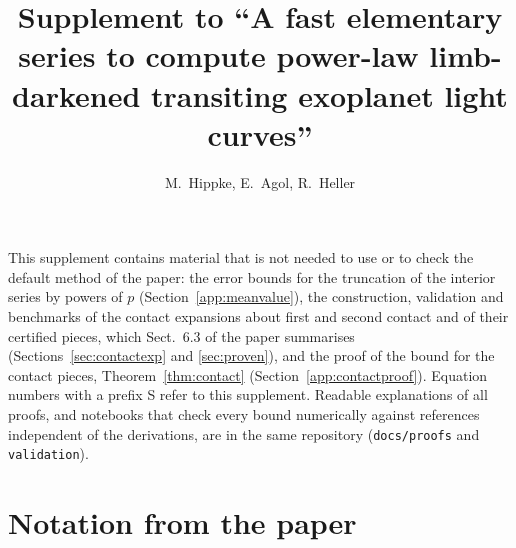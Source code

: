 \documentclass[11pt]{article}
\title{Supplement to ``A fast elementary series to compute power-law limb-darkened transiting exoplanet light curves''}
\author{M.~Hippke, E.~Agol, R.~Heller}
\date{}
\begin{document}
\maketitle

This supplement contains material that is not needed to use or to check the default method of the paper:
the error bounds for the truncation of the interior series by powers of $p$ (Section~\ref{app:meanvalue}),
the construction, validation and benchmarks of the contact expansions about first and second contact and of their
certified pieces, which Sect.~6.3 of the paper summarises (Sections~\ref{sec:contactexp} and \ref{sec:proven}),
and the proof of the bound for the contact pieces, Theorem~\ref{thm:contact} (Section~\ref{app:contactproof}).
Equation numbers with a prefix S refer to this supplement. Readable explanations of all proofs, and
notebooks that check every bound numerically against references independent of the derivations, are in the
same repository (\texttt{docs/proofs} and \texttt{validation}).

\section*{Notation from the paper}
\end{document}

